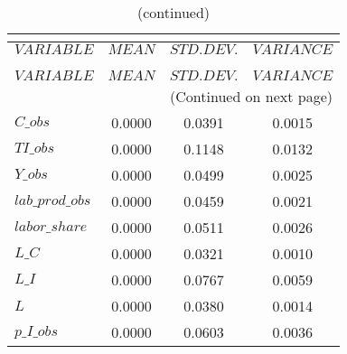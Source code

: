  
\begin{center}
\begin{longtable}{lccc} 
\caption{THEORETICAL MOMENTS}\\
 \label{Table:th_moments}\\
\toprule 
$VARIABLE        $	 & 	 $         MEAN$	 & 	 $    STD. DEV.$	 & 	 $     VARIANCE$\\
\midrule \endfirsthead 
\caption{(continued)}\\
 \toprule \\ 
$VARIABLE        $	 & 	 $         MEAN$	 & 	 $    STD. DEV.$	 & 	 $     VARIANCE$\\
\midrule \endhead 
\midrule \multicolumn{4}{r}{(Continued on next page)} \\ \bottomrule \endfoot 
\bottomrule \endlastfoot 
$C\_obs          $	 & 	       0.0000	 & 	       0.0391	 & 	       0.0015 \\ 
$TI\_obs         $	 & 	       0.0000	 & 	       0.1148	 & 	       0.0132 \\ 
$Y\_obs          $	 & 	       0.0000	 & 	       0.0499	 & 	       0.0025 \\ 
$lab\_prod\_obs  $	 & 	       0.0000	 & 	       0.0459	 & 	       0.0021 \\ 
$labor\_share    $	 & 	       0.0000	 & 	       0.0511	 & 	       0.0026 \\ 
$L\_C            $	 & 	       0.0000	 & 	       0.0321	 & 	       0.0010 \\ 
$L\_I            $	 & 	       0.0000	 & 	       0.0767	 & 	       0.0059 \\ 
$L               $	 & 	       0.0000	 & 	       0.0380	 & 	       0.0014 \\ 
$p\_I\_obs       $	 & 	       0.0000	 & 	       0.0603	 & 	       0.0036 \\ 
\end{longtable}
 \end{center}
